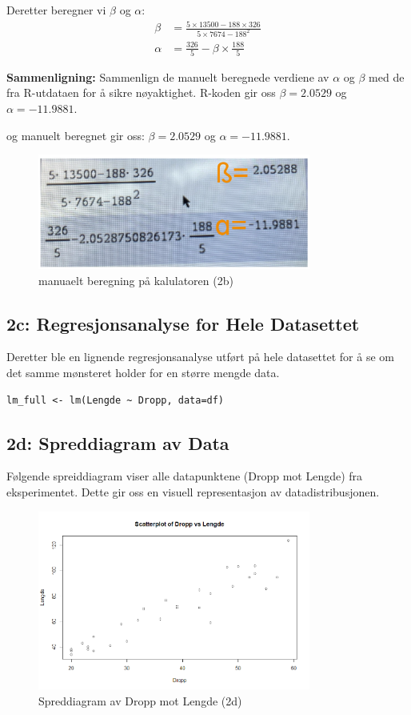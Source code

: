 \documentclass{article}
\begin{document}
Deretter beregner vi \( \beta \) og \( \alpha \):
\begin{align*}
\beta &= \frac{5 \times 13500 - 188 \times 326}{5 \times 7674 - 188^2} \\
\alpha &= \frac{326}{5} - \beta \times \frac{188}{5}
\end{align*}

\textbf{Sammenligning:} 
Sammenlign de manuelt beregnede verdiene av \( \alpha \) og \( \beta \) med de fra R-utdataen for å sikre nøyaktighet.
R-koden gir oss \( \beta = 2.0529 \) og \( \alpha = -11.9881 \).

og manuelt beregnet gir oss: \( \beta = 2.0529 \) og \( \alpha = -11.9881 \).
\begin{figure}[H]
    \centering
    \includegraphics[width=0.8\textwidth]{manual_calculation_regresion.png}
    \caption{manuaelt beregning på kalulatoren (2b)}
\end{figure}

\subsection{2c: Regresjonsanalyse for Hele Datasettet}
Deretter ble en lignende regresjonsanalyse utført på hele datasettet for å se om det samme mønsteret holder for en større mengde data.

\begin{lstlisting}[style=Rstyle]
    lm_full <- lm(Lengde ~ Dropp, data=df)
    \end{lstlisting}

\subsection{2d: Spreddiagram av Data}
Følgende spreiddiagram viser alle datapunktene (Dropp mot Lengde) fra eksperimentet. Dette gir oss en visuell representasjon av datadistribusjonen.

\begin{figure}[H]
    \centering
    \includegraphics[width=0.8\textwidth]{Rplot03.png}
    \caption{Spreddiagram av Dropp mot Lengde (2d)}
\end{figure}
\end{document}
